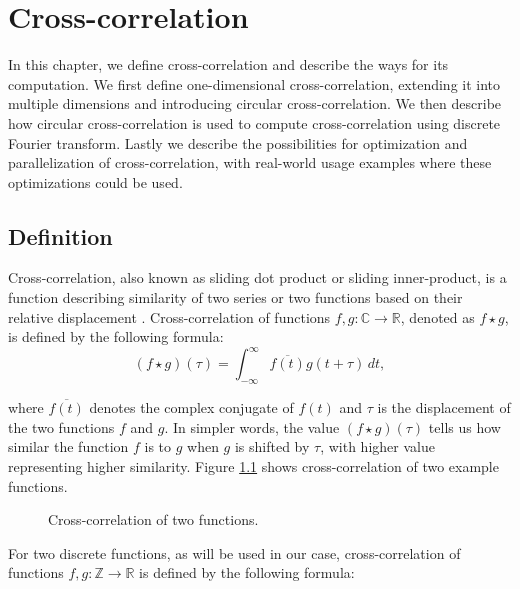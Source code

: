 
\chapter{Cross-correlation}
\label{sec:cross-corr}

In this chapter, we define cross-correlation and describe the ways for its computation. We first define one-dimensional cross-correlation, extending it into multiple dimensions and introducing circular cross-correlation. We then describe how circular cross-correlation is used to compute cross-correlation using discrete Fourier transform. Lastly we describe the possibilities for optimization and parallelization of cross-correlation, with real-world usage examples where these optimizations could be used.


\section{Definition}

Cross-correlation, also known as sliding dot product or sliding inner-product, is a function describing similarity of two series or two functions based on their relative displacement \citep{site:wiki_cross_corr}.
Cross-correlation of functions $f,g: \mathbb{C} \rightarrow \mathbb{R}$, denoted as \(f \star g\), is defined by the following formula:
\[
	(f \star g)(\tau) = \int_{-\infty}^{\infty} \overline{f(t)}g(t + \tau) \,dt,
\] 

where \(\overline{f(t)}\) denotes the complex conjugate of \(f(t)\) and \(\tau\) is the displacement of the two functions \(f\) and \(g\). In simpler words, the value \((f \star g)(\tau)\) tells us how similar the function \(f\) is to \(g\) when \(g\) is shifted by \(\tau\), with higher value representing higher similarity. Figure \ref{fig:cross_corr_example} shows cross-correlation of two example functions.

\begin{figure}[h]
	\centering
	\def\svgwidth{0.8\textwidth}
	
	\caption{Cross-correlation of two functions. \cite{pic:crosscorr}}
	\label{fig:cross_corr_example}
\end{figure}

For two discrete functions, as will be used in our case, cross-correlation of functions \( f, g : \mathbb{Z} \rightarrow \mathbb{R} \) is defined by the following formula:

